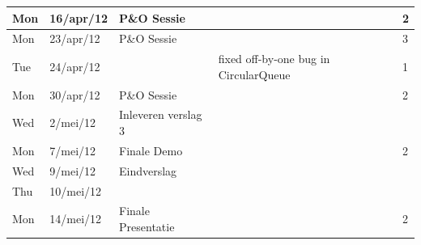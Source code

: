\documentclass[12pt,a4paper]{report}
\begin{document}
\begin{landscape}
\begin{longtable}{llp{7cm}p{10cm}l}
\hline
Mon & 16/apr/12 & P\&O Sessie &  & 2 \\ 
\hline
Mon & 23/apr/12 & P\&O Sessie &  & 3 \\ 
\hline
Tue & 24/apr/12 &  & fixed off-by-one bug in CircularQueue & 1 \\ 
\hline
Mon & 30/apr/12 & P\&O Sessie &  & 2 \\ 
\hline
Wed & 2/mei/12 & Inleveren verslag 3 &  &  \\ 
\hline
Mon & 7/mei/12 & Finale Demo &  & 2 \\ 
\hline
Wed & 9/mei/12 & Eindverslag &  &  \\ 
\hline
Thu & 10/mei/12 &  &  &  \\ 
\hline
Mon & 14/mei/12 & Finale Presentatie &  & 2 \\ 
\hline



\end{longtable}
\normalsize

\end{landscape}




\end{document}
